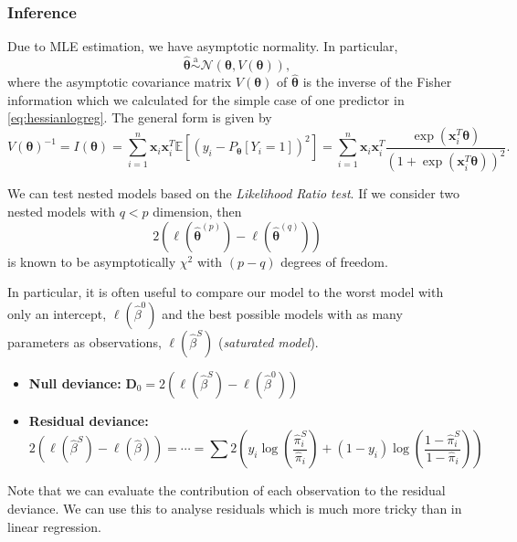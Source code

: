\documentclass[11pt, %
	oneside, %
	english, %
	onehalfspacing, %
	]{article} %
\numberwithin{equation}{section}
\begin{document}
\subsubsection*{Inference}

Due to MLE estimation, we have asymptotic normality. In particular,
$$
\widehat{\mathbf{\theta}} \overset{\text{a}}{\sim}\mathcal{N}(\mathbf{\theta}, V(\mathbf{\theta})),
$$
where the asymptotic covariance matrix $V(\mathbf{\theta})$ of $\widehat{\mathbf{\theta}}$ is the inverse of the Fisher information which we calculated for the simple case of one predictor in \eqref{eq:hessianlogreg}. The general form is given by
\begin{equation*}
    V(\mathbf{\theta})^{-1}=I(\mathbf{\theta})=\sum_{i=1}^n \mathbf{x}_i \mathbf{x}_i^T \mathbb{E}\left[\left(y_i-P_{\mathbf{\theta}}\left[Y_i=1\right]\right)^2\right]=\sum_{i=1}^n \mathbf{x}_i \mathbf{x}_i^T \frac{\exp \left(\mathbf{x}_i^T \mathbf{\theta}\right)}{\left(1+\exp \left(\mathbf{x}_i^T \mathbf{\theta}\right)\right)^2} .
\end{equation*}

We can test nested models based on the \emph{Likelihood Ratio test}. If we consider two nested models with $q <p$ dimension, then
\begin{equation*}
    2\left(\ell\left(\widehat{\mathbf{\theta}}^{(p)}\right)-\ell\left(\widehat{\mathbf{\theta}}^{(q)}\right)\right)
\end{equation*}
is known to be asymptotically $\chi^2$ with $(p-q)$ degrees of freedom.

In particular, it is often useful to compare our model to the worst model with only an intercept, $\ell\left(\hat{\beta}^0\right)$ and the best possible models with as many parameters as observations, $\ell\left(\hat{\beta}^S\right)$ (\emph{saturated model}).

\begin{itemize}
    \item \textbf{Null deviance:} $\mathbf{D}_0=2\left(\ell\left(\hat{\beta}^S\right)-\ell\left(\hat{\beta}^0\right)\right)$
    \item \textbf{Residual deviance:}
    \begin{equation*}
        2\left(\ell\left(\hat{\beta}^S\right)-\ell(\hat{\beta})\right)=\cdots=\sum 2\left(y_i \log \left(\frac{\hat{\pi}_i^S}{\hat{\pi}_i}\right)+\left(1-y_i\right) \log \left(\frac{1-\hat{\pi}_i^S}{1-\hat{\pi}_i}\right)\right)
    \end{equation*}
\end{itemize}
Note that we can evaluate the contribution of each observation to the residual deviance. We can use this to analyse residuals which is much more tricky than in linear regression.
\end{document}

